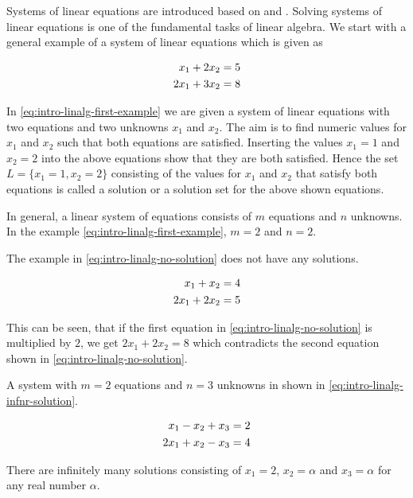 \documentclass[]{book}
\theoremstyle{definition}
\theoremstyle{definition}
\theoremstyle{definition}
\theoremstyle{remark}
\begin{document}
Systems of linear equations are introduced based on \citep{Nipp2002} and \citep{Searle1971}. Solving systems of linear equations is one of the fundamental tasks of linear algebra. We start with a general example of a system of linear equations which is given as

\begin{align}
 x_1 + 2x_2 &= 5 \notag \\
2x_1 + 3x_2 &= 8
\label{eq:intro-linalg-first-example}
\end{align}

In \eqref{eq:intro-linalg-first-example} we are given a system of linear equations with two equations and two unknowns \(x_1\) and \(x_2\). The aim is to find numeric values for \(x_1\) and \(x_2\) such that both equations are satisfied. Inserting the values \(x_1 = 1\) and \(x_2 = 2\) into the above equations show that they are both satisfied. Hence the set \(L = \{x_1 = 1, x_2 = 2\}\) consisting of the values for \(x_1\) and \(x_2\) that satisfy both equations is called a solution or a solution set for the above shown equations.

In general, a linear system of equations consists of \(m\) equations and \(n\) unknowns. In the example \eqref{eq:intro-linalg-first-example}, \(m=2\) and \(n=2\).

The example in \eqref{eq:intro-linalg-no-solution} does not have any solutions.

\begin{align}
 x_1 +  x_2 &= 4 \notag \\
2x_1 + 2x_2 &= 5
\label{eq:intro-linalg-no-solution}
\end{align}

This can be seen, that if the first equation in \eqref{eq:intro-linalg-no-solution} is multiplied by \(2\), we get \(2x_1 + 2x_2 = 8\) which contradicts the second equation shown in \eqref{eq:intro-linalg-no-solution}.

A system with \(m=2\) equations and \(n=3\) unknowns in shown in \eqref{eq:intro-linalg-infnr-solution}.

\begin{align}
 x_1 -  x_2 +  x_3 &= 2 \notag \\
2x_1 +  x_2 -  x_3 &= 4  
\label{eq:intro-linalg-infnr-solution}
\end{align}

There are infinitely many solutions consisting of \(x_1 = 2\), \(x_2 = \alpha\) and \(x_3 = \alpha\) for any real number \(\alpha\).
\end{document}
